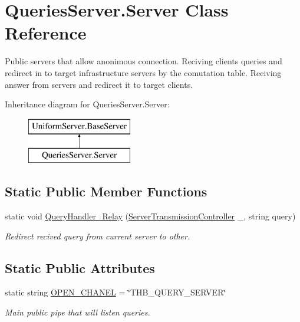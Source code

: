 \hypertarget{class_queries_server_1_1_server}{}\section{Queries\+Server.\+Server Class Reference}
\label{class_queries_server_1_1_server}


Public servers that allow anonimous connection. Reciving clients\textquotesingle{} queries and redirect in to target infrastructure servers by the comutation table. Reciving answer from servers and redirect it to target clients.  


Inheritance diagram for Queries\+Server.\+Server\+:\begin{figure}[H]
\begin{center}
\leavevmode
\includegraphics[height=2.000000cm]{d2/d9a/class_queries_server_1_1_server}
\end{center}
\end{figure}
\subsection*{Static Public Member Functions}
\begin{DoxyCompactItemize}
\item 
static void \mbox{\hyperlink{class_queries_server_1_1_server_ac288a3c122f127e67894b255edd823af}{Query\+Handler\+\_\+\+Relay}} (\mbox{\hyperlink{class_pipes_provider_1_1_server_1_1_server_transmission_controller}{Server\+Transmission\+Controller}} \+\_\+, string query)
\begin{DoxyCompactList}\small\item\em Redirect recived query from current server to other. \end{DoxyCompactList}\end{DoxyCompactItemize}
\subsection*{Static Public Attributes}
\begin{DoxyCompactItemize}
\item 
static string \mbox{\hyperlink{class_queries_server_1_1_server_a5d7c4c9ababa7292ef7cac92005d3563}{O\+P\+E\+N\+\_\+\+C\+H\+A\+N\+EL}} = \char`\"{}T\+H\+B\+\_\+\+Q\+U\+E\+R\+Y\+\_\+\+S\+E\+R\+V\+ER\char`\"{}
\begin{DoxyCompactList}\small\item\em Main public pipe that will listen queries. \end{DoxyCompactList}\end{DoxyCompactItemize}
